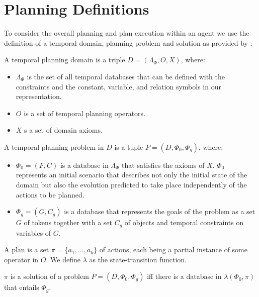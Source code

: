 \section{Planning Definitions}

To consider the overall planning and plan execution within an agent we
use the definition of a temporal domain, planning problem and solution
as provided by \cite{Nau:2004}:
\begin{definition}
  \label{def:domain}
  A temporal planning domain is a triple $D = ( \Lambda_\Phi, O, X )$, where:
  \begin{itemize}
  \item $\Lambda_\Phi$ is the set of all temporal databases that can be 
    defined with the constraints and the constant, variable, and relation 
    symbols in our representation.
  \item $O$ is a set of temporal planning operators.
  \item $X$ s a set of domain axioms.
  \end{itemize}
\end{definition}

\begin{definition}
  \label{def:problem}
  A temporal planning problem in $D$ is a tuple $P = ( D, \Phi_0, \Phi_g )$, where:
  \begin{itemize}
  \item $\Phi_0 = (F, C)$ is a database in $\Lambda_\Phi$ that satisfies the axioms of $X$.
    $\Phi_0$ represents an initial scenario that describes not only the initial 
    state of the domain but also the evolution predicted to take place 
    independently of the actions to be planned.
  \item $\Phi_g = (G, C_g)$ is a database that represents the goals of the problem 
    as a set $G$ of tokens together with a set $C_g$ of objects and temporal 
    constraints on variables of $G$. 
  \end{itemize}
\end{definition}

\begin{definition}
  \label{def:plan}
A plan is a set $\pi = \{a_1,...,a_k\}$ of actions, each
  being a partial instance of some operator in $O$.  
  We define $\lambda$ as the state-transition function.

  $\pi$ is a solution of a problem $P = (D, \Phi_0, \Phi_g)$ iff
  there is a  database in $\lambda(\Phi_0, \pi)$ that entails $\Phi_g$.
\end{definition}
 
